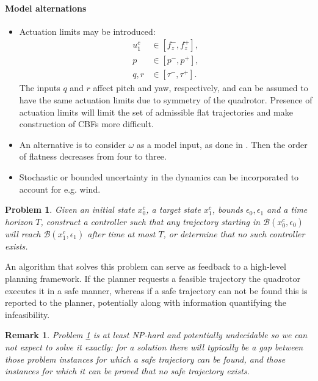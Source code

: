\documentclass[conference]{IEEEtran}
\newtheorem{problem}{Problem}
\newtheorem{remark}{Remark}
\begin{document}
\paragraph{Model alternations}
\begin{itemize}
  \item Actuation limits may be introduced:
  \begin{equation}
  \begin{aligned}
    u_1^c & \in [f_z^-, f_z^+], \\
    p & \in [p^-, p^+], \\
    q,r & \in [\tau^- , \tau^+].
  \end{aligned}
  \end{equation}
  The inputs $q$ and $r$ affect pitch and yaw, respectively, and can be assumed to have the same actuation limits due to symmetry of the quadrotor. Presence of actuation limits will limit the set of admissible flat trajectories and make construction of CBFs more difficult.
  \item An alternative is to consider $\omega$ as a model input, as done in \cite{Wang2017}. Then the order of flatness decreases from four to three.
  \item Stochastic or bounded uncertainty in the dynamics can be incorporated to account for e.g. wind.
\end{itemize}

\begin{problem}
  \label{prob:main}
  Given an initial state $x^c_0$, a target state $x^c_1$, bounds $\epsilon_0, \epsilon_1$ and a time horizon $T$, construct a controller such that any trajectory starting in $\mathcal B(x^c_0, \epsilon_0)$ will reach $\mathcal B(x_1^c, \epsilon_1)$ after time at most $T$, or determine that no such controller exists.
\end{problem}

An algorithm that solves this problem can serve as feedback to a high-level planning framework. If the planner requests a feasible trajectory the quadrotor executes it in a safe manner, whereas if a safe trajectory can not be found this is reported to the planner, potentially along with information quantifying the infeasibility.

\begin{remark}
  Problem \ref{prob:main} is at least NP-hard and potentially undecidable \cite{Bell2010} so we can not expect to solve it exactly: for a solution there will typically be a gap between those problem instances for which a safe trajectory can be found, and those instances for which it can be proved that no safe trajectory exists. 
\end{remark}
\end{document}
